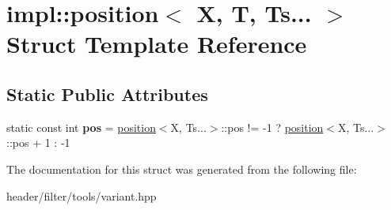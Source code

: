 \hypertarget{structimpl_1_1position_3_01_x_00_01_t_00_01_ts_8_8_8_01_4}{}\section{impl\+:\+:position$<$ X, T, Ts... $>$ Struct Template Reference}
\label{structimpl_1_1position_3_01_x_00_01_t_00_01_ts_8_8_8_01_4}
\subsection*{Static Public Attributes}
\begin{DoxyCompactItemize}
\item 
\mbox{\label{structimpl_1_1position_3_01_x_00_01_t_00_01_ts_8_8_8_01_4_a659a0e57c1c34f02df768c0278c68797}} 
static const int {\bfseries pos} = \hyperlink{structimpl_1_1position}{position}$<$X, Ts...$>$\+::pos != -\/1 ? \hyperlink{structimpl_1_1position}{position}$<$X, Ts...$>$\+::pos + 1 \+: -\/1
\end{DoxyCompactItemize}


The documentation for this struct was generated from the following file\+:\begin{DoxyCompactItemize}
\item 
header/filter/tools/variant.\+hpp\end{DoxyCompactItemize}
